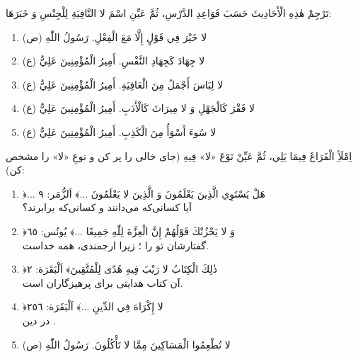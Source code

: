 \begin{JTest}
تَرْجِمْ هٰذِهِ الْأَحَادِيثَ حَسَبَ قَوَاعِدِ الدَّرْسِ، ثُمَّ عَيِّنِ اسْمَ لا
النَّافِيَةِ لِلْجِنْسِ وَ خَبَرَهَا:

\begin{enumerate}
  \item لا خَيْرَ فِي قَوْلٍ إِلَّا مَعَ الْفِعْلِ. رَسُولُ اللّٰهِ (ص)
  \item لا جِهَادَ كَجِهَادِ النَّفْسِ. أَمِيرُ الْمُؤْمِنِينَ عَلِيٌّ (ع)
  \item لا لِبَاسَ أَجْمَلُ مِنَ الْعَافِيَةِ. أَمِيرُ الْمُؤْمِنِينَ عَلِيٌّ (ع)
  \item لا فَقْرَ كَالْجَهْلِ وَ لا مِيرَاثَ كَالْأَدَبِ. أَمِيرُ الْمُؤْمِنِينَ
        عَلِيٌّ (ع)
  \item لا سُوءَ أَسْوَأُ مِنَ الْكَذِبِ. أَمِيرُ الْمُؤْمِنِينَ عَلِيٌّ (ع)
\end{enumerate}
\end{JTest}

\begin{JTest}
اِمْلَأِ الْفَرَاغَ فِيمَا يَلِي، ثُمَّ عَيِّنْ نَوْعَ «لا» فِيهِ
(جای خالی را پر کن و نوعِ «لا» را مشخص کن):

\begin{enumerate}
  \item ﴿... هَلْ يَسْتَوِي الَّذِينَ يَعْلَمُونَ وَ الَّذِينَ لا يَعْلَمُونَ
        ...﴾ اَلزُّمَر: ٩\\
        آیا کسانی‌که می‌دانند و کسانی‌که \JdotsW{4cm} برابرند؟
  \item ﴿وَ لا يَحْزُنْكَ قَوْلُهُمْ إِنَّ الْعِزَّةَ لِلّٰهِ جَمِيعًا ...﴾
        يُونُس: ٦٥\\
        گفتارشان تو را \JdotsW{3.2cm}؛ زیرا ارجمندی، همه \JdotsW{2.8cm} خداست.
  \item ﴿ذٰلِكَ الْكِتَابُ لا رَيْبَ فِيهِ هُدًى لِلْمُتَّقِينَ﴾
        اَلْبَقَرَة: ٢\\
        آن کتاب \JdotsW{4.2cm} هدایتی برای پرهیزگاران است.
  \item ﴿لا إِكْرَاهَ فِي الدِّينِ ...﴾ اَلْبَقَرَة: ٢٥٦\\
        \JdotsW{3.5cm} در دین \JdotsW{3.5cm}.
  \item لا تُطْعِمُوا الْمَسَاكِينَ مِمَّا لا تَأْكُلُونَ. رَسُولُ اللّٰهِ (ص)\\
        \Jdots
\end{enumerate}
\end{JTest}

